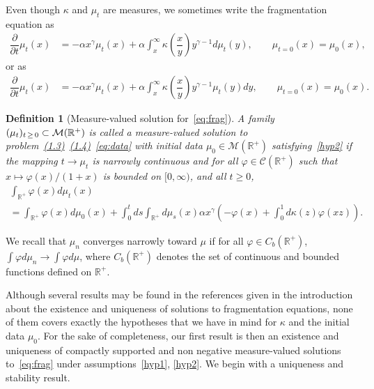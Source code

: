 \documentclass[10pt,a4paper]{amsart}
\numberwithin{equation}{section}
\newcommand*\dst{\displaystyle}
\newcommand*\p{\partial}
\renewcommand*\a{\alpha}
\newcommand*\R{\mathbb{R}}
\newcommand*\M{\mathcal{M}}
\newcommand{\clC}{\mathcal{C}}
\newtheorem{defi}{Definition}[section]
\begin{document}
Even though $\kappa$ and $\mu_t$ are measures, we sometimes write the fragmentation equation as
\begin{equation}\label{eq:frag}
\begin{aligned}
\dfrac{\p}{\p t}\mu_t (x)& =- \a x^{\gamma}\mu_t(x) + \alpha \dst\int_{x}^{\infty}\kappa\left(\dfrac{x}{y} \right)y^{\gamma-1} d\mu_t(y),\qquad
\mu_{t=0}(x) = \mu_0(x),
\end{aligned}
\end{equation}
or as
\begin{equation*}\label{eq:frag2}
\begin{aligned}
\dfrac{\p}{\p t}\mu_t (x)& =- \a x^{\gamma}\mu_t(x) + \alpha \dst\int_{x}^{\infty}\kappa\left(\dfrac{x}{y} \right)y^{\gamma-1} \mu_t(y)dy,\qquad
\mu_{t=0}(x) = \mu_0(x).
\end{aligned}
\end{equation*}

\begin{defi}[Measure-valued solution for~\eqref{eq:frag}]\label{def:measure_valued_sol}
A family $(\mu_t)_{t\,\geq\,0} \subset \M\linebreak(\R^+)$ is called a measure-valued solution to problem~\href{https://ahl.centre-mersenne.org/item/AHL_2024__7__621_0/}{(1.3)}~\href{https://ahl.centre-mersenne.org/item/AHL_2024__7__621_0/}{(1.4)}~\eqref{eq:data} with initial data $\mu_0 \in \M(\R^+)$ satisfying~\eqref{hyp2} if the mapping $t\to \mu_t$ is narrowly continuous and for all $\varphi \in \clC(\R^+)$ such that $x\mapsto \varphi(x)/(1+x)$ is bounded on $[0,\infty)$, and all $t \geq 0$,
\begin{multline}\label{ppcm1}
\int_{\R^+} \varphi(x) d\mu_t(x)\\
= \int_{\R^+} \varphi(x) d\mu_0(x) + \dst\int_0^t ds \dst\int_{\R^+} d\mu_s(x) \alpha x^{\gamma}\left(- \varphi(x) + \dst\int_{0}^{1} d\kappa(z)\varphi(xz)\right).
\end{multline}
\end{defi}

We recall that $\mu_n$ converges narrowly toward $\mu$ if for all $\varphi \in C_b(\R^+)$, $\int \varphi d\mu_n \to \int \varphi d\mu$, where $C_b(\R^+)$ denotes the set of continuous and bounded functions defined on $\R^+$.

Although several results may be found in the references given in the introduction about the existence and uniqueness of solutions to fragmentation equations, none of them covers exactly the hypotheses that we have in mind for $\kappa$ and the initial data $\mu _0$. For the sake of completeness, our first result is then an existence and uniqueness of compactly supported and non negative measure-valued solutions to~\eqref{eq:frag} under assumptions~\eqref{hyp1}, \eqref{hyp2}. We begin with a uniqueness and stability result.
\end{document}
